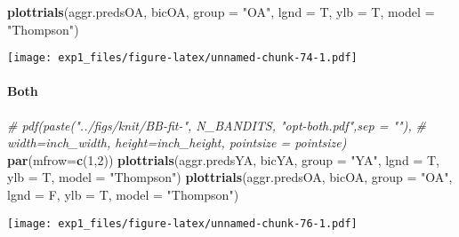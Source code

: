 \documentclass[11pt,,]{article}
\newenvironment{Shaded}{\begin{snugshade}}{\end{snugshade}}
\newcommand{\KeywordTok}[1]{\textcolor[rgb]{0.13,0.29,0.53}{\textbf{{#1}}}}
\newcommand{\DataTypeTok}[1]{\textcolor[rgb]{0.13,0.29,0.53}{{#1}}}
\newcommand{\DecValTok}[1]{\textcolor[rgb]{0.00,0.00,0.81}{{#1}}}
\newcommand{\StringTok}[1]{\textcolor[rgb]{0.31,0.60,0.02}{{#1}}}
\newcommand{\CommentTok}[1]{\textcolor[rgb]{0.56,0.35,0.01}{\textit{{#1}}}}
\newcommand{\NormalTok}[1]{{#1}}
\let\oldparagraph\paragraph
\renewcommand{\paragraph}[1]{\oldparagraph{#1}\mbox{}}
\begin{document}
\begin{Shaded}
\begin{Highlighting}[]
\KeywordTok{plottrials}\NormalTok{(aggr.predsOA, bicOA, }\DataTypeTok{group =} \StringTok{"OA"}\NormalTok{, }\DataTypeTok{lgnd =} \NormalTok{T, }\DataTypeTok{ylb =} \NormalTok{T, }\DataTypeTok{model =} \StringTok{"Thompson"}\NormalTok{)}
\end{Highlighting}
\end{Shaded}

\texttt{[image: exp1\_files/figure-latex/unnamed-chunk-74-1.pdf]}

\newpage

\paragraph{Both}\label{both-1}

\begin{Shaded}
\end{Shaded}

\begin{Shaded}
\begin{Highlighting}[]
\CommentTok{# pdf(paste("../figs/knit/BB-fit-",  N_BANDITS, "opt-both.pdf",sep = ""), }
\CommentTok{# width=inch_width, height=inch_height, pointsize = pointsize)}
\KeywordTok{par}\NormalTok{(}\DataTypeTok{mfrow=}\KeywordTok{c}\NormalTok{(}\DecValTok{1}\NormalTok{,}\DecValTok{2}\NormalTok{))}
\KeywordTok{plottrials}\NormalTok{(aggr.predsYA, bicYA, }\DataTypeTok{group =} \StringTok{"YA"}\NormalTok{, }\DataTypeTok{lgnd =} \NormalTok{T, }\DataTypeTok{ylb =} \NormalTok{T, }\DataTypeTok{model =} \StringTok{"Thompson"}\NormalTok{)}
\KeywordTok{plottrials}\NormalTok{(aggr.predsOA, bicOA, }\DataTypeTok{group =} \StringTok{"OA"}\NormalTok{, }\DataTypeTok{lgnd =} \NormalTok{F, }\DataTypeTok{ylb =} \NormalTok{T, }\DataTypeTok{model =} \StringTok{"Thompson"}\NormalTok{)}
\end{Highlighting}
\end{Shaded}

\texttt{[image: exp1\_files/figure-latex/unnamed-chunk-76-1.pdf]}
\end{document}
